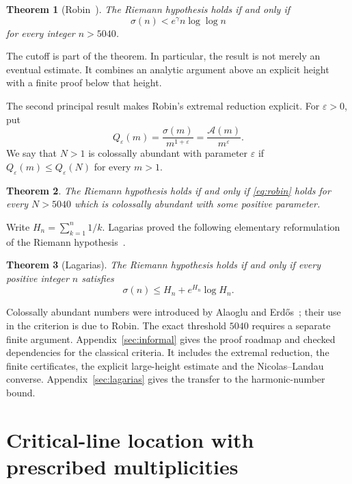 \documentclass[11pt]{amsart}
\newtheorem{theorem}{Theorem}[section]
\theoremstyle{definition}
\theoremstyle{remark}
\numberwithin{equation}{section}
\newcommand{\euler}{\gamma}
\newcommand{\sig}{\sigma}
\newcommand{\A}{\mathcal{A}}
\newcommand{\eps}{\varepsilon}
\begin{document}
\begin{theorem}[Robin~\cite{Robin1984}]\label{thm:main}
The Riemann hypothesis holds if and only if
\begin{equation}\label{eq:robin}
  \sig(n)<e^{\euler}n\log\log n
\end{equation}
for every integer $n>5040$.
\end{theorem}

The cutoff is part of the theorem.  In particular, the result is not merely
an eventual estimate.  It combines an analytic argument above an explicit
height with a finite proof below that height.

The second principal result makes Robin's extremal reduction explicit.  For
$\eps>0$, put
\begin{equation}\label{eq:ca-objective}
  Q_{\eps}(m)=\frac{\sig(m)}{m^{1+\eps}}
             =\frac{\A(m)}{m^{\eps}}.
\end{equation}
We say that $N>1$ is colossally abundant with parameter $\eps$ if
$Q_{\eps}(m)\le Q_{\eps}(N)$ for every $m>1$.

\begin{theorem}\label{thm:ca-main}
The Riemann hypothesis holds if and only if \eqref{eq:robin} holds for every
$N>5040$ which is colossally abundant with some positive parameter.
\end{theorem}

Write $H_n=\sum_{k=1}^n 1/k$.  Lagarias proved the following elementary
reformulation of the Riemann hypothesis~\cite{Lagarias2002}.

\begin{theorem}[Lagarias]\label{thm:lagarias}
The Riemann hypothesis holds if and only if every positive integer $n$
satisfies
\begin{equation}\label{eq:lagarias}
  \sig(n)\le H_n+e^{H_n}\log H_n.
\end{equation}
\end{theorem}

Colossally abundant numbers were introduced by Alaoglu and
Erd\H{o}s~\cite{AlaogluErdos1944}; their use in the criterion is
due to Robin. The exact threshold \(5040\) requires a separate
finite argument. Appendix~\ref{sec:informal} gives the proof
roadmap and checked dependencies for the classical criteria.
It includes the extremal reduction, the finite certificates,
the explicit large-height estimate and the Nicolas--Landau
converse. Appendix~\ref{sec:lagarias} gives the transfer to the
harmonic-number bound.

\section{Critical-line location with prescribed multiplicities}
\label{sec:multiplicity}
\end{document}
